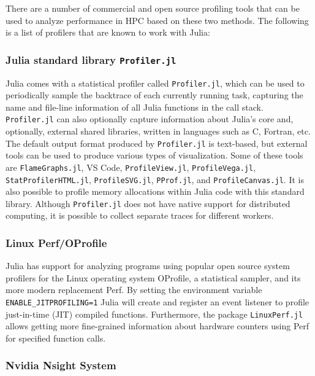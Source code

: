 \documentclass{juliacon}
\newcommand{\jlpkg}[1]{\texttt{#1}}
\begin{document}
There are a number of commercial and open source profiling tools that can be used to analyze performance in HPC based on these two methods.
The following is a list of profilers that are known to work with Julia:

\subsubsection*{Julia standard library \jlpkg{Profiler.jl}}
\label{sec:profiler-jl}

Julia comes with a statistical profiler called \jlpkg{Profiler.jl}, which can be used to periodically sample the backtrace of each currently running task, capturing the name and file-line information of all Julia functions in the call stack.
\jlpkg{Profiler.jl} can also optionally capture information about Julia's core and, optionally, external shared libraries, written in languages such as C, Fortran, etc.
The default output format produced by \jlpkg{Profiler.jl} is text-based, but external tools can be used to produce various types of visualization.
Some of these tools are \jlpkg{FlameGraphs.jl}, VS Code, \jlpkg{ProfileView.jl}, \jlpkg{ProfileVega.jl}, \jlpkg{StatProfilerHTML.jl}, \jlpkg{ProfileSVG.jl}, \jlpkg{PProf.jl}, and \jlpkg{ProfileCanvas.jl}.
It is also possible to profile memory allocations within Julia code with this standard library.
Although \jlpkg{Profiler.jl} does not have native support for distributed computing, it is possible to collect separate traces for different workers.

\subsubsection*{Linux Perf/OProfile}
\label{sec:linux-perf-oprofile}

Julia has support for analyzing programs using popular open source system profilers for the Linux operating system OProfile, a statistical sampler, and its more modern replacement Perf.
By setting the environment variable \jlpkg{ENABLE\_JITPROFILING=1} Julia will create and register an event listener to profile just-in-time (JIT) compiled functions.
Furthermore, the package \jlpkg{LinuxPerf.jl}~\cite{linuxperfjl} allows getting more fine-grained information about hardware counters using Perf for specified function calls.

\subsubsection*{Nvidia Nsight System}
\label{sec:nvidia-nsight-system}
\end{document}
